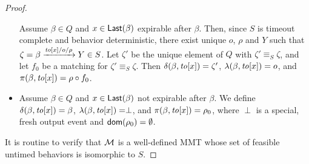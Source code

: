 \begin{proof}
\begin{itemize}
Assume $\beta \in Q$ and $x\in \mathsf{Last}({\beta})$ expirable after $\beta$. 
Then, since $S$ is  timeout complete and behavior deterministic, there exist unique
$o$, $\rho$ and $Y$ such that $\zeta = \beta \xrightarrow{\mathit{to}[x]/o/\rho} Y \in S$.
Let $\zeta'$ be the unique element of $Q$ with $\zeta' \equiv_S \zeta$, and
let $f_0$ be a matching for $\zeta' \equiv_S \zeta$.
Then $\delta(\beta,\mathit{to}[x]) = \zeta'$, $\lambda(\beta,\mathit{to}[x]) = o$, and $\pi(\beta,\mathit{to}[x]) = \rho \circ f_0$.
\item
Assume $\beta \in Q$ and $x \in \mathsf{Last}({\beta})$ not expirable after $\beta$.
We define $\delta(\beta,\mathit{to}[x]) = \beta$, $\lambda(\beta,\mathit{to}[x]) = \perp$, and $\pi(\beta,\mathit{to}[x]) = \rho_0$, 
where $\perp$ is a special, fresh output event and ${\textsf{dom}}(\rho_0) = \emptyset$.
\end{itemize}
It is routine to verify that ${\mathcal M}$ is a well-defined MMT whose set of feasible untimed behaviors is isomorphic to $S$.
\end{proof}
